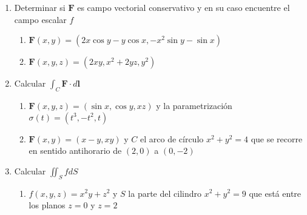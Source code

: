 \documentclass{article}
\begin{document}
\begin{enumerate}
        \item {
            Determinar si $\mathbf{F}$ es campo vectorial conservativo y en su caso encuentre el campo escalar $f$
            
            \begin{enumerate}
            \item{
				$\mathbf{F} (x,y) = (2x\cos y - y\cos x, -x^2\sin y -\sin x)$
				
			\color{azul}
           

            }
            
            \item{
            	$\mathbf{F} (x,y,z) = (2xy, x^2 + 2yz, y^2)$
           
           \color{azul}
            
            }
            \end{enumerate}           
        }

        \item {
           Calcular $\int_{C} \mathbf{F} \cdot d \mathbf{l}$
            
            \begin{enumerate}
            \item{
				$\mathbf{F} (x,y,z) = (\sin x,\cos y,xz)$ y la parametrización $\sigma (t) = (t^3,-t^2,t)$
				
			\color{azul}
           

            }
            
            \item{
            	$\mathbf{F} (x,y) = (x-y,xy)$ y $C$ el arco de círculo $x^2 + y^2 = 4$ que se recorre en sentido antihorario de $(2,0)$ a $(0,-2)$
           
           \color{azul}
            
            }
            \end{enumerate}           
        }

        \item {
            Calcular $\iint_{S} f dS$
            
            \begin{enumerate}
            \item{
				$f(x,y,z) = x^2y + z^2$ y $S$ la parte del cilindro $x^2 + y^2 = 9$ que está entre los planos $z=0$ y $z=2$
				
}
\end{enumerate}}
\end{enumerate}
\end{document}
